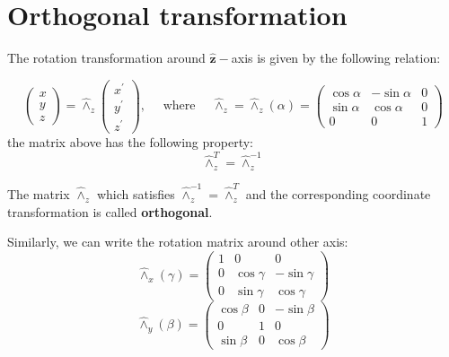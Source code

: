 \section{Orthogonal transformation}
The rotation transformation around $\hat{\mathbf{z}}-$axis is given by the following relation:
\begin{qt}
\begin{equation}
\left(\begin{array}{l}
{x} \\
{y} \\
{z}
\end{array}\right)=\hat{\wedge}_{z}\left(\begin{array}{l}
{x^{\prime}} \\
{y^{\prime}} \\
{z^{\prime}}
\end{array}\right), \quad \text { where } \quad \hat{\wedge}_{z}=\hat{\wedge}_{z}(\alpha)=\left(\begin{array}{ccc}
{\cos \alpha} & {-\sin \alpha} & {0} \\
{\sin \alpha} & {\cos \alpha} & {0} \\
{0} & {0} & {1}
\end{array}\right)
\end{equation}
the matrix above has the following property:
\begin{equation}
\hat{\wedge}_{z}^{T}=\hat{\wedge}_{z}^{-1}
\end{equation}
\end{qt}
\begin{defi}
        The matrix $\hat{\wedge}_{z}$ which satisfies $\hat{\wedge}_{z}^{-1}=\hat{\wedge}_{z}^{T}$ and the corresponding coordinate transformation is called \textbf{orthogonal}.
\end{defi}
Similarly, we can write the rotation matrix around other axis:
\begin{equation}
\hat{\wedge}_{x}(\gamma)=\left(\begin{array}{ccc}
{1} & {0} & {0}\\
{0} & {\cos \gamma} & {-\sin \gamma} \\
{0} & {\sin \gamma} & {\cos \gamma}
\end{array}\right)
\end{equation}
\begin{equation}
\hat{\wedge}_{y}(\beta)=\left(\begin{array}{ccc}
{\cos \beta} & {0} & {-\sin \beta} \\
{0} & {1} & {0}\\
{\sin \beta} & {0} &  {\cos \beta}
\end{array}\right)
\end{equation}
